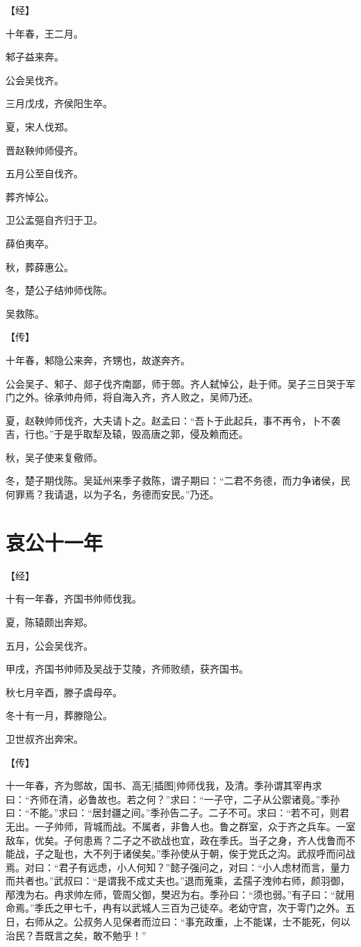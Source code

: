 \documentclass[a4paper,12pt,UTF8,twoside]{ctexbook}
\begin{document}
【经】

十年春，王二月。

邾子益来奔。

公会吴伐齐。

三月戊戌，齐侯阳生卒。

夏，宋人伐郑。

晋赵鞅帅师侵齐。

五月公至自伐齐。

葬齐悼公。

卫公孟彄自齐归于卫。

薛伯夷卒。

秋，葬薛惠公。

冬，楚公子结帅师伐陈。

吴救陈。

【传】

十年春，邾隐公来奔，齐甥也，故遂奔齐。

公会吴子、邾子、郯子伐齐南鄙，师于鄎。齐人弑悼公，赴于师。吴子三日哭于军门之外。徐承帅舟师，将自海入齐，齐人败之，吴师乃还。

夏，赵鞅帅师伐齐，大夫请卜之。赵孟曰：“吾卜于此起兵，事不再令，卜不袭吉，行也。”于是乎取犁及辕，毁高唐之郭，侵及赖而还。

秋，吴子使来复儆师。

冬，楚子期伐陈。吴延州来季子救陈，谓子期曰：“二君不务德，而力争诸侯，民何罪焉？我请退，以为子名，务德而安民。”乃还。

\section{哀公十一年}




【经】

十有一年春，齐国书帅师伐我。

夏，陈辕颇出奔郑。

五月，公会吴伐齐。

甲戌，齐国书帅师及吴战于艾陵，齐师败绩，获齐国书。

秋七月辛酉，滕子虞母卒。

冬十有一月，葬滕隐公。

卫世叔齐出奔宋。

【传】

十一年春，齐为鄎故，国书、高无[插图]帅师伐我，及清。季孙谓其宰冉求曰：“齐师在清，必鲁故也。若之何？”求曰：“一子守，二子从公禦诸竟。”季孙曰：“不能。”求曰：“居封疆之间。”季孙告二子。二子不可。求曰：“若不可，则君无出。一子帅师，背城而战。不属者，非鲁人也。鲁之群室，众于齐之兵车。一室敌车，优矣。子何患焉？二子之不欲战也宜，政在季氏。当子之身，齐人伐鲁而不能战，子之耻也，大不列于诸侯矣。”季孙使从于朝，俟于党氏之沟。武叔呼而问战焉。对曰：“君子有远虑，小人何知？”懿子强问之，对曰：“小人虑材而言，量力而共者也。”武叔曰：“是谓我不成丈夫也。”退而蒐乘，孟孺子洩帅右师，颜羽御，邴洩为右。冉求帅左师，管周父御，樊迟为右。季孙曰：“须也弱。”有子曰：“就用命焉。”季氏之甲七千，冉有以武城人三百为己徒卒。老幼守宫，次于雩门之外。五日，右师从之。公叔务人见保者而泣曰：“事充政重，上不能谋，士不能死，何以治民？吾既言之矣，敢不勉乎！”
\end{document}
